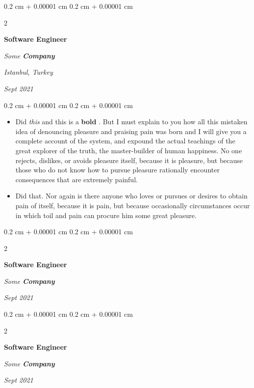 \documentclass[10pt, letterpaper]{article}
\newenvironment{highlights}{
    \begin{itemize}[
        topsep=0.10 cm,
        parsep=0.10 cm,
        partopsep=0pt,
        itemsep=0pt,
        leftmargin=0.4 cm + 10pt
    ]
}{
    \end{itemize}
} %
\newenvironment{onecolentry}{
    \begin{adjustwidth}{
        0.2 cm + 0.00001 cm
    }{
        0.2 cm + 0.00001 cm
    }
}{
    \end{adjustwidth}
} %
\newenvironment{twocolentry}[2][]{
    \onecolentry
    \def\secondColumn{#2}
    \setcolumnwidth{\fill, 4.5 cm}
    \begin{paracol}{2}
}{
    \switchcolumn \raggedleft \secondColumn
    \end{paracol}
    \endonecolentry
} %
\let\hrefWithoutArrow\href
\renewcommand{\href}[2]{\hrefWithoutArrow{#1}{\ifthenelse{\equal{#2}{}}{ }{#2 }\raisebox{.15ex}{\footnotesize \faExternalLink*}}}
\begin{document}
        \vspace{0.2 cm}

        \begin{twocolentry}{
        \textit{Istanbul, Turkey}    
            
        \textit{Sept 2021}}
            \textbf{Software Engineer}
            
            \textit{Some \textbf{Company}}
        \end{twocolentry}

        \vspace{0.10 cm}
        \begin{onecolentry}
            \begin{highlights}
                \item Did \textit{this} and this is a \textbf{bold} \href{https://example.com}{link}. But I must explain to you how all this mistaken idea of denouncing pleasure and praising pain was born and I will give you a complete account of the system, and expound the actual teachings of the great explorer of the truth, the master-builder of human happiness. No one rejects, dislikes, or avoids pleasure itself, because it is pleasure, but because those who do not know how to pursue pleasure rationally encounter consequences that are extremely painful.
                \item Did that. Nor again is there anyone who loves or pursues or desires to obtain pain of itself, because it is pain, but because occasionally circumstances occur in which toil and pain can procure him some great pleasure.
            \end{highlights}
        \end{onecolentry}


        \vspace{0.2 cm}

        \begin{twocolentry}{
            
            
        \textit{Sept 2021}}
            \textbf{Software Engineer}
            
            \textit{Some \textbf{Company}}
        \end{twocolentry}



        \vspace{0.2 cm}

        \begin{twocolentry}{
            
            
        \textit{Sept 2021}}
            \textbf{Software Engineer}
            
            \textit{Some \textbf{Company}}
        \end{twocolentry}
\end{document}

